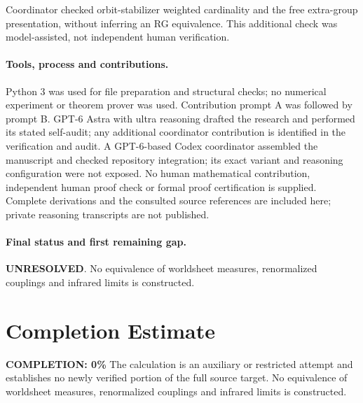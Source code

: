 \documentclass[11pt]{article}
\begin{document}
Coordinator checked orbit-stabilizer weighted cardinality and the free extra-group presentation, without inferring an RG equivalence. This additional check was model-assisted, not independent human verification.

\paragraph{Tools, process and contributions.}
Python 3 was used for file preparation and structural checks; no numerical experiment or theorem prover was used. Contribution prompt A was followed by prompt B. GPT-6 Astra with ultra reasoning drafted the research and performed its stated self-audit; any additional coordinator contribution is identified in the verification and audit. A GPT-6-based Codex coordinator assembled the manuscript and checked repository integration; its exact variant and reasoning configuration were not exposed. No human mathematical contribution, independent human proof check or formal proof certification is supplied. Complete derivations and the consulted source references are included here; private reasoning transcripts are not published.

\paragraph{Final status and first remaining gap.}
\textbf{UNRESOLVED}. No equivalence of worldsheet measures, renormalized couplings and infrared limits is constructed.

\section{Completion Estimate}
\noindent\textbf{COMPLETION: 0\%}
The calculation is an auxiliary or restricted attempt and establishes no newly verified portion of the full source target. No equivalence of worldsheet measures, renormalized couplings and infrared limits is constructed.
\end{document}
